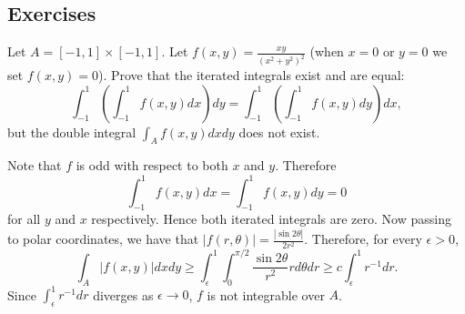 \subsection{Exercises} 

  \begin{exercise}
    Let $A=[-1,1]\times[-1,1]$. Let $f(x,y)=\frac{xy}{(x^{2}+y^{2})^{2}}$ (when $x=0$ or $y=0$ we set $f(x,y)=0$). Prove that the iterated integrals exist and are equal:
    \begin{equation}
      \int_{-1}^{1}(\int_{-1}^{1}f(x,y)dx)dy=\int_{-1}^{1}(\int_{-1}^{1}f(x,y)dy)dx,
    \end{equation}
    but the double integral $\int_{A}f(x,y) dxdy$ does not exist.
  \end{exercise}
  \begin{solution}
    Note that $f$ is odd with respect to both $x$ and $y$. Therefore
    \begin{equation}
      \int_{-1}^{1}f(x,y)dx = \int_{-1}^{1}f(x,y)dy=0
    \end{equation}
    for all $y$ and $x$ respectively. Hence both iterated integrals are zero. Now passing to polar coordinates, we have that $|f(r,\theta)|=\frac{|\sin 2\theta|}{2r^{2}}$. Therefore, for every $\epsilon>0$,
    \begin{equation}
      \int_{A}|f(x,y)|dxdy\ge\int_{\epsilon}^{1}\int_{0}^{\pi/2}\frac{\sin 2\theta}{r^{2}}rd\theta dr\ge c\int_{\epsilon}^{1}r^{-1}dr.
    \end{equation}
    Since $\int_{\epsilon}^{1}r^{-1}dr$ diverges as $\epsilon\rightarrow0$, $f$ is not integrable over $A$.
  \end{solution}



